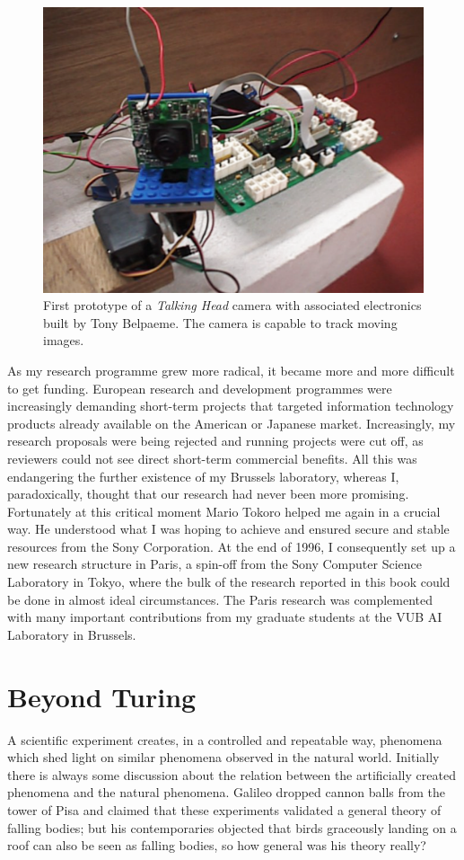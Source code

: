 \begin{figure}[htbp]
  \centerline{\includegraphics[width=.70\textwidth]{chap1/figs/eye.pdf}}
\caption{First prototype of a {\itshape Talking Head} camera with 
associated electronics built by Tony Belpaeme. The camera is capable to track moving images. }
\label{f:plate7}
\end{figure}

As my research programme grew more radical, it became more 
and more difficult to get funding. 
European research and development programmes were 
increasingly demanding short-term projects that targeted information
technology products already available on the American or Japanese 
market. Increasingly, my
research proposals were being rejected and running projects were
cut off,
as reviewers could not see direct short-term 
commercial benefits. All this was endangering the further existence
of my Brussels laboratory, whereas I, paradoxically, thought that
our research had never been more promising. 
Fortunately at this critical moment Mario Tokoro
helped me again in a crucial way. He understood what I was
hoping to achieve and ensured secure and stable resources from 
the Sony Corporation. At the end of 1996, I consequently set up a new research
structure in Paris, a spin-off from the Sony Computer Science
Laboratory in Tokyo, where the bulk of the research reported
in this book could be done in almost ideal circumstances. 
The Paris research was complemented with many important 
contributions from my graduate students
at the VUB AI Laboratory in Brussels. 

\section{Beyond Turing}

A scientific experiment creates, in a controlled
and repeatable way, phenomena which shed light on
similar phenomena observed in the natural
world. Initially there is
always some discussion about the relation between 
the artificially created phenomena and the natural
phenomena. Galileo dropped cannon balls from
the tower of Pisa and claimed that these experiments validated 
a general theory of falling bodies; but his contemporaries 
objected that birds graceously landing on a roof can
also be seen as falling bodies, so how general was 
his theory really?  

